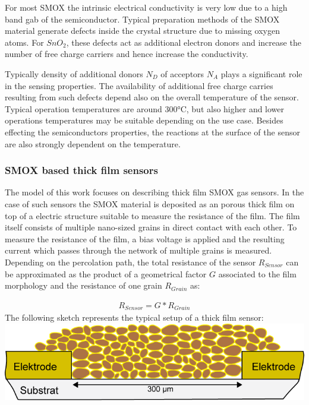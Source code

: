 \documentclass[11pt]{article}
\begin{document}
For most SMOX the intrinsic electrical conductivity is very low due to a
high band gab of the semiconductor. Typical preparation methods of the
SMOX material generate defects inside the crystal structure due to
missing oxygen atoms. For \(SnO_2\), these defects act as additional
electron donors and increase the number of free charge carriers and
hence increase the conductivity.

Typically density of additional donors \(N_D\) of acceptors \(N_A\)
plays a significant role in the sensing properties. The availability of
additional free charge carries resulting from such defects depend also
on the overall temperature of the sensor. Typical operation temperatures
are around 300°C, but also higher and lower operations temperatures may
be suitable depending on the use case. Besides effecting the
semiconductors properties, the reactions at the surface of the sensor
are also strongly dependent on the temperature.

\hypertarget{smox-based-thick-film-sensors}{%
\subsubsection{SMOX based thick film
sensors}\label{smox-based-thick-film-sensors}}

The model of this work focuses on describing thick film SMOX gas
sensors. In the case of such sensors the SMOX material is deposited as
an porous thick film on top of a electric structure suitable to measure
the resistance of the film. The film itself consists of multiple
nano-sized grains in direct contact with each other. To measure the
resistance of the film, a bias voltage is applied and the resulting
current which passes through the network of multiple grains is measured.
Depending on the percolation path, the total resistance of the sensor
\(R_{Sensor}\) can be approximated as the product of a geometrical
factor \(G\) associated to the film morphology and the resistance of one
grain \(R_{Grain}\) as:

\begin{align}
R_{Sensor}  = G * R_{Grain} \label{r_sensor_r_grain}\tag{Resistance of sensor}
\end{align} The following sketch represents the typical setup of a thick
film sensor: \includegraphics{media/grains_sensor.png}
\end{document}
